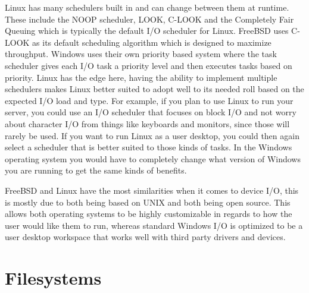 \documentclass[10pt,serif,draftclsnofoot,onecolumn]{IEEEtran}
\begin{document}
	Linux has many schedulers built in and can change between them at runtime. These include the NOOP scheduler, LOOK, C-LOOK and the Completely Fair Queuing which is typically the default I/O scheduler for Linux\cite{2}. FreeBSD uses C-LOOK as its default scheduling algorithm which is designed to maximize throughput\cite{1}. Windows uses their own priority based system where the task scheduler gives each I/O task a priority level and then executes tasks based on priority. Linux has the edge here, having the ability to implement multiple schedulers makes Linux better suited to adopt well to its needed roll based on the expected I/O load and type. For example, if you plan to use Linux to run your server, you could use an I/O scheduler that focuses on block I/O and not worry about character I/O from things like keyboards and monitors, since those will rarely be used. If you want to run Linux as a user desktop, you could then again select a scheduler that is better suited to those kinds of tasks. In the Windows operating system you would have to completely change what version of Windows you are running to get the same kinds of benefits.
	\newline
	\par
	FreeBSD and Linux have the most similarities when it comes to device I/O, this is mostly due to both being based on UNIX and both being open source. This allows both operating systems to be highly customizable in regards to how the user would like them to run, whereas standard Windows I/O is optimized to be a user desktop workspace that works well with third party drivers and devices.
\section{Filesystems}
\end{document}
